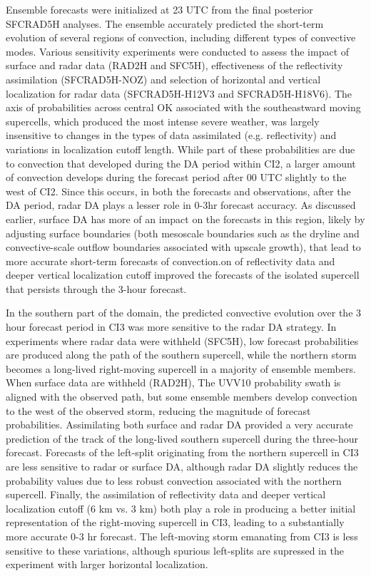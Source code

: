 Ensemble forecasts were initialized at 23 UTC from the final posterior SFCRAD5H analyses. The ensemble accurately predicted the short-term evolution of several regions of convection, including different types of convective modes. Various sensitivity experiments were conducted to assess the impact of surface and radar data (RAD2H and SFC5H), effectiveness of the reflectivity assimilation (SFCRAD5H-NOZ) and selection of horizontal and vertical localization for radar data (SFCRAD5H-H12V3 and SFCRAD5H-H18V6). The axis of probabilities across central OK associated with the southeastward moving supercells, which produced the most intense severe weather, was largely insensitive to changes in the types of data assimilated (e.g. reflectivity) and variations in localization cutoff length. While part of these probabilities are due to convection that developed during the DA period within CI2, a larger amount of convection develops during the forecast period after 00 UTC slightly to the west of CI2. Since this occurs, in both the forecasts and observations, after the DA period, radar DA plays a lesser role in 0-3hr forecast accuracy. As discussed earlier, surface DA has more of an impact on the forecasts in this region, likely by adjusting surface boundaries (both mesoscale boundaries such as the dryline and convective-scale outflow boundaries associated with upscale growth), that lead to more accurate short-term forecasts of convection.on of reflectivity data and deeper vertical localization cutoff improved the forecasts of the isolated supercell that persists through the 3-hour forecast.

In the southern part of the domain, the predicted convective evolution over the 3 hour forecast period in CI3 was more sensitive to the radar DA strategy. In experiments where radar data were withheld (SFC5H), low forecast probabilities are produced along the path of the southern supercell, while the northern storm becomes a long-lived right-moving supercell in a majority of ensemble members. When surface data are withheld (RAD2H), The UVV10 probability swath is aligned with the observed path, but some ensemble members develop convection to the west of the observed storm, reducing the magnitude of forecast probabilities. Assimilating both surface and radar DA provided a very accurate prediction of the track of the long-lived southern supercell during the three-hour forecast. Forecasts of the left-split originating from the northern supercell in CI3 are less sensitive to radar or surface DA, although radar DA slightly reduces the probability values due to less robust convection associated with the northern supercell. Finally, the assimilation of reflectivity data and deeper vertical localization cutoff (6 km vs. 3 km) both play a role in producing a better initial representation of the right-moving supercell in CI3, leading to a substantially more accurate 0-3 hr forecast. The left-moving storm emanating from CI3 is less sensitive to these variations, although spurious left-splits are supressed in the experiment with larger horizontal localization.

